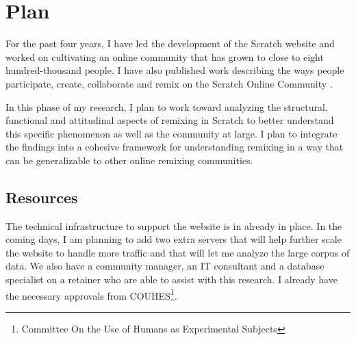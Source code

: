 \chapter{Plan}

For the past four years, I have led the development of the Scratch website and worked on cultivating an online community that has grown to close to eight hundred-thousand people.
I have also published work describing the ways people participate, create, collaborate and remix on the Scratch Online Community \citep{monroy-hernandez_scratchr:_2007, monroy-hernandez_empowering_2008, monroy-hernandez_computers_2011, hill_responses_2010, aragon_tale_2009, nickerson_appropriation_2011, brennan_making_2010}.

In this phase of my research, I plan to work toward analyzing the structural, functional and attitudinal aspects of remixing in Scratch to better understand this specific phenomenon as well as the community at large.
I plan to integrate the findings into a cohesive framework for understanding remixing in a way that can be generalizable to other online remixing communities.

\section{Resources}
The technical infrastructure to support the website is in already in place.
In the coming days, I am planning to add two extra servers that will help further scale the website to handle more traffic and that will let me analyze the large corpus of data.
We also have a community manager, an IT consultant and a database specialist on a retainer who are able to assist with this research.
I already have the necessary approvals from COUHES\footnote{Committee On the Use of Humans as Experimental Subjects}.

